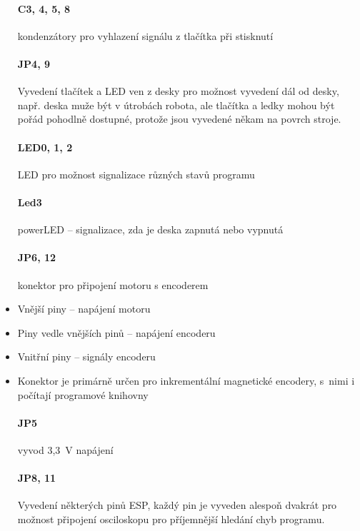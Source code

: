 \documentclass{template/socthesis}
\begin{document}
\begin{itemize}
	\paragraph*{C3, 4, 5, 8}
	kondenzátory pro vyhlazení signálu z tlačítka při stisknutí
	
	\paragraph*{JP4, 9}
	Vyvedení tlačítek a LED ven z desky pro možnost	
	vyvedení dál od desky, např. deska muže být v útrobách robota, ale tlačítka a ledky mohou být 
	pořád pohodlně dostupné, protože jsou vyvedené	
	někam na povrch stroje.
	
	\paragraph*{LED0, 1, 2}
	LED pro možnost signalizace různých stavů programu
	
	\paragraph*{Led3}
	powerLED -- signalizace, zda je deska zapnutá nebo vypnutá
	
	\paragraph*{JP6, 12}
	konektor pro připojení motoru s encoderem
	\item Vnější piny – napájení motoru
	\item Piny vedle vnějších pinů – napájení encoderu
	\item Vnitřní piny – signály encoderu
	\item Konektor je primárně určen pro inkrementální magnetické encodery, s~nimi i počítají programové knihovny
	
	\paragraph*{JP5}
	vyvod 3,3~V napájení
	
	\paragraph*{JP8, 11}
	Vyvedení některých pinů ESP, každý pin je vyveden alespoň dvakrát pro možnost připojení osciloskopu pro příjemnější hledání chyb programu.
	


\end{itemize}
\end{document}
